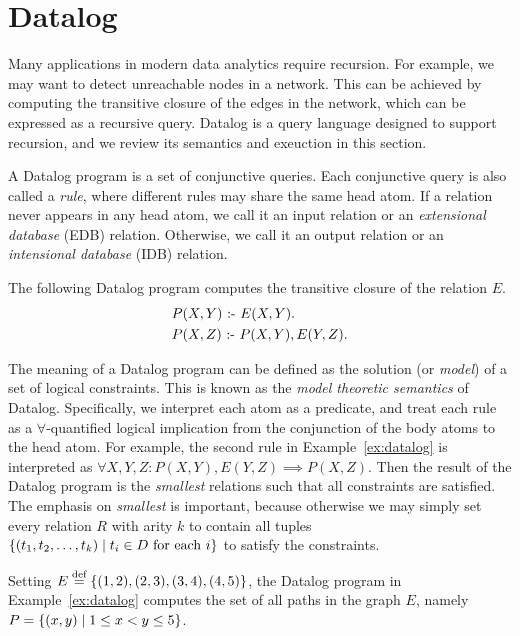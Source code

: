 \section{Datalog}
\label{sec:datalog}

Many applications in modern data analytics require recursion.
For example, we may want to detect unreachable nodes in a network.
This can be achieved by computing the transitive closure 
 of the edges in the network,
 which can be expressed as a recursive query.
Datalog is a query language designed to support recursion, 
 and we review its semantics and exeuction in this section.

A Datalog program is a set of conjunctive queries.
Each conjunctive query is also called a {\em rule}, 
 where different rules may share the same head atom. 
If a relation never appears in any head atom,
 we call it an input relation or an {\em extensional database} (EDB) relation.
Otherwise, we call it an output relation or an {\em intensional database} (IDB) relation.

\begin{ex}
\label{ex:datalog}
The following Datalog program computes the transitive closure of the relation $E$. 
\begin{align*}
  &P(X, Y) \text{ :- } E(X, Y).\\
  &P(X, Z) \text{ :- } P(X, Y), E(Y, Z).
\end{align*}
\end{ex}

The meaning of a Datalog program can be defined as the solution (or {\em model}) of 
 a set of logical constraints.
This is known as the {\em model theoretic semantics} of Datalog.
Specifically, we interpret each atom as a predicate,
 and treat each rule as a $\forall$-quantified logical implication
 from the conjunction of the body atoms to the head atom.
For example, the second rule in Example~\ref{ex:datalog} 
 is interpreted as $\forall X, Y, Z : P(X, Y), E(Y, Z) \implies P(X, Z)$.
Then the result of the Datalog program is the {\em smallest} relations 
 such that all constraints are satisfied.
The emphasis on {\em smallest} is important, 
 because otherwise we may simply set every relation $R$ with arity $k$ 
 to contain all tuples $\{{(t_1, t_2, \ldots, t_k)}\mid{t_i \in D \text{ for each } i}\}$
 to satisfy the constraints.

\begin{ex}
\label{ex:tc}
Setting $E \stackrel{\text{def}}{=} \{(1, 2), (2, 3), (3, 4), (4, 5)\}$,
 the Datalog program in Example~\ref{ex:datalog}
 computes the set of all paths in the graph $E$, 
 namely $P = \{{(x, y)}\mid{1 \leq x < y \leq 5}\}$. 
\end{ex}

